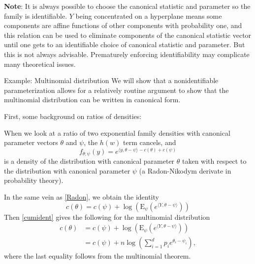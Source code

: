 \documentclass[
  ignorenonframetext,
]{beamer}
\begin{document}
\begin{frame}{}
\protect\hypertarget{section-5}{}
\textbf{Note}: It is always possible to choose the canonical statistic
and parameter so the family is identifiable. \(Y\) being concentrated on
a hyperplane means some components are affine functions of other
components with probability one, and this relation can be used to
eliminate components of the canonical statistic vector until one gets to
an identifiable choice of canonical statistic and parameter. But this is
not always advisable. Prematurely enforcing identifiability may
complicate many theoretical issues.
\end{frame}

\begin{frame}{Example: Multinomial distribution}
\protect\hypertarget{example-multinomial-distribution}{}
We will show that a nonidentifiable parameterization allows for a
relatively routine argument to show that the multinomial distribution
can be written in canonical form.

First, some background on ratios of densities:

When we look at a ratio of two exponential family densities with
canonical parameter vectors \(\theta\) and \(\psi\), the \(h(w)\) term
cancels, and \begin{equation} \label{Radon}
  f_{\theta;\psi}(y) = e^{\langle y,\theta - \psi\rangle - c(\theta) + c(\psi)} 
\end{equation} is a density of the distribution with canonical parameter
\(\theta\) taken with respect to the distribution with canonical
parameter \(\psi\) (a Radon-Nikodym derivate in probability theory).
\end{frame}

\begin{frame}{}
\protect\hypertarget{section-6}{}
In the same vein as \eqref{Radon}, we obtain the identity
\begin{equation} \label{cumident}
    c(\theta) = c(\psi) + \log\left(\mathrm{E}_{\psi}\left(e^{\langle Y, \theta - \psi \rangle}\right)\right)
\end{equation} Then \eqref{cumident} gives the following for the
multinomial distribution \begin{align*}
  c(\theta) &= c(\psi) + \log\left(\mathrm{E}_{\psi}\left(e^{\langle Y, \theta - \psi \rangle}\right)\right) \\
  &= c(\psi) + n\log\left(\sum_{i=1}^d p_ie^{\theta_i - \psi_i}\right),
\end{align*} where the last equality follows from the multinomial
theorem.
\end{frame}
\end{document}
